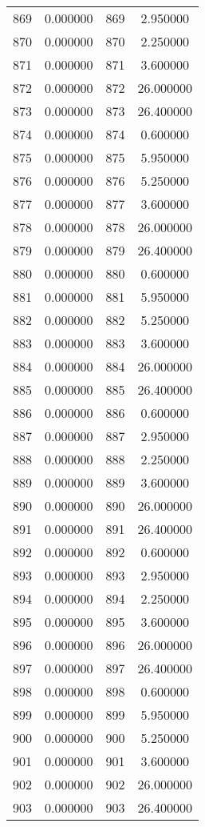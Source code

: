 \documentclass[12pt]{article}
\begin{document}
\begin{longtable}{@{}cccc@{}}
869 & 0.000000 & 869 & 2.950000 \\
870 & 0.000000 & 870 & 2.250000 \\
871 & 0.000000 & 871 & 3.600000 \\
872 & 0.000000 & 872 & 26.000000 \\
873 & 0.000000 & 873 & 26.400000 \\
874 & 0.000000 & 874 & 0.600000 \\
875 & 0.000000 & 875 & 5.950000 \\
876 & 0.000000 & 876 & 5.250000 \\
877 & 0.000000 & 877 & 3.600000 \\
878 & 0.000000 & 878 & 26.000000 \\
879 & 0.000000 & 879 & 26.400000 \\
880 & 0.000000 & 880 & 0.600000 \\
881 & 0.000000 & 881 & 5.950000 \\
882 & 0.000000 & 882 & 5.250000 \\
883 & 0.000000 & 883 & 3.600000 \\
884 & 0.000000 & 884 & 26.000000 \\
885 & 0.000000 & 885 & 26.400000 \\
886 & 0.000000 & 886 & 0.600000 \\
887 & 0.000000 & 887 & 2.950000 \\
888 & 0.000000 & 888 & 2.250000 \\
889 & 0.000000 & 889 & 3.600000 \\
890 & 0.000000 & 890 & 26.000000 \\
891 & 0.000000 & 891 & 26.400000 \\
892 & 0.000000 & 892 & 0.600000 \\
893 & 0.000000 & 893 & 2.950000 \\
894 & 0.000000 & 894 & 2.250000 \\
895 & 0.000000 & 895 & 3.600000 \\
896 & 0.000000 & 896 & 26.000000 \\
897 & 0.000000 & 897 & 26.400000 \\
898 & 0.000000 & 898 & 0.600000 \\
899 & 0.000000 & 899 & 5.950000 \\
900 & 0.000000 & 900 & 5.250000 \\
901 & 0.000000 & 901 & 3.600000 \\
902 & 0.000000 & 902 & 26.000000 \\
903 & 0.000000 & 903 & 26.400000 \\

\end{longtable}
\end{document}
